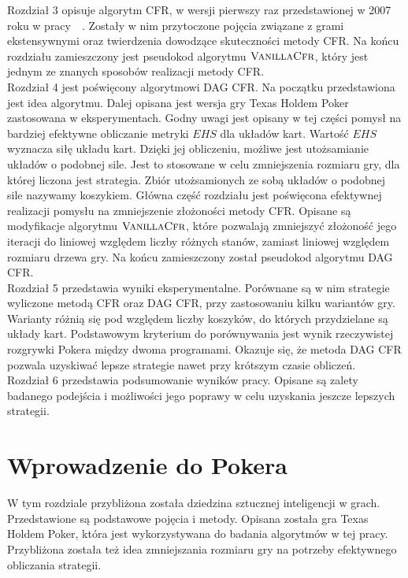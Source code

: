 \documentclass[magisterska]{pracamgr}
\begin{document}
\noindent
Rozdział 3 opisuje algorytm CFR, w wersji pierwszy raz przedstawionej w 2007 roku w pracy~\cite{cfr}~.
Zostały w nim przytoczone pojęcia
związane z grami ekstensywnymi oraz twierdzenia dowodzące skuteczności metody CFR. Na końcu rozdziału
zamieszczony jest pseudokod algorytmu $\Call{VanillaCfr}{}$, który jest jednym ze znanych sposobów realizacji metody CFR. \\

\noindent
Rozdział 4 jest poświęcony algorytmowi DAG CFR. Na początku przedstawiona jest idea algorytmu.
Dalej opisana jest wersja gry Texas Holdem Poker zastosowana w eksperymentach. Godny uwagi
jest opisany w tej części pomysł na bardziej efektywne obliczanie metryki $EHS$ dla układów kart.
Wartość $EHS$ wyznacza siłę układu kart. Dzięki jej obliczeniu, możliwe jest utożsamianie układów
o podobnej sile. Jest to stosowane w celu zmniejszenia rozmiaru gry, dla której liczona jest strategia.
Zbiór utożsamionych ze sobą układów o podobnej sile nazywamy koszykiem.
Główna część rozdziału jest poświęcona efektywnej realizacji pomysłu na zmniejszenie złożoności
metody CFR. Opisane są modyfikacje algorytmu $\Call{VanillaCfr}{}$, które pozwalają zmniejszyć złożoność
jego iteracji do liniowej względem liczby różnych stanów, zamiast liniowej względem rozmiaru drzewa gry.
Na końcu zamieszczony został pseudokod algorytmu DAG CFR. \\

\noindent
Rozdział 5 przedstawia wyniki eksperymentalne. Porównane są w nim strategie wyliczone metodą
CFR oraz DAG CFR, przy zastosowaniu kilku wariantów gry. Warianty różnią się pod względem
liczby koszyków, do których przydzielane są układy kart. Podstawowym kryterium
do porównywania jest wynik rzeczywistej rozgrywki Pokera między dwoma programami. Okazuje się,
że metoda DAG CFR pozwala uzyskiwać lepsze strategie nawet przy krótszym czasie obliczeń. \\

\noindent
Rozdział 6 przedstawia podsumowanie wyników pracy. Opisane są zalety badanego podejścia
i możliwości jego poprawy w celu uzyskania jeszcze lepszych strategii.

\chapter{Wprowadzenie do Pokera}

\noindent
W tym rozdziale przybliżona została dziedzina sztucznej inteligencji w grach. Przedstawione
są podstawowe pojęcia i metody. Opisana została gra Texas Holdem Poker, która jest
wykorzystywana do badania algorytmów w tej pracy. Przybliżona została też idea
zmniejszania rozmiaru gry na potrzeby efektywnego obliczania strategii.
\end{document}
